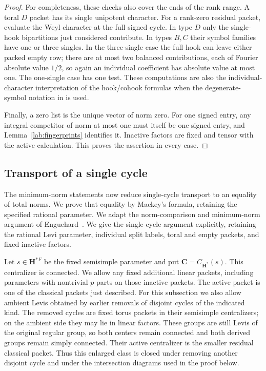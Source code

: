\begin{proof}
For completeness, these checks also cover the ends of the rank
range.  A toral $D$ packet has its single unipotent character.
For a rank-zero residual packet, evaluate the Weyl character at
the full signed cycle.  In type $D$ only the single-hook
bipartitions just considered contribute.  In types $B,C$ their
symbol families have one or three singles.  In the three-single
case the full hook can leave either packed empty row; there are
at most two balanced contributions, each of Fourier absolute
value $1/2$, so again an individual coefficient has absolute
value at most one.  The one-single case has one test.  These
computations are also the individual-character interpretation
of the hook/cohook formulas when the degenerate-symbol notation
in \cite[Theorem~3.2]{LubeckMalle} is used.

Finally, a zero list is the unique vector of norm zero.  For one
signed entry, any integral competitor of norm at most one must
itself be one signed entry, and Lemma~\ref{lab:fingerprints}
identifies it.  Inactive factors are fixed and tensor with the
active calculation.  This proves the assertion in every case.
\end{proof}

\subsection{Transport of a single cycle}

The minimum-norm statements now reduce single-cycle transport to
an equality of total norms.  We prove that equality by Mackey's
formula, retaining the specified rational parameter.
We adapt the norm-comparison and minimum-norm argument of
Enguehard~\cite[Section~5.3, equations~(5.3.3)--(5.3.8) and
Lemma~5.3.9]{EnguehardJordan}.  We give the single-cycle argument
explicitly, retaining the rational Levi parameter, individual split
labels, toral and empty packets, and fixed inactive factors.

Let $s\in\mathbf H^{*F}$ be the fixed semisimple parameter and
put $\mathbf C=C_{\mathbf H^*}(s)$.  This centralizer is connected.
We allow any fixed additional linear packets, including parameters
with nontrivial $p$-parts on those inactive packets.  The active
packet is one of the classical packets just described.
For this subsection we also allow ambient Levis obtained by earlier
removals of disjoint cycles of the indicated kind.  The removed
cycles are fixed torus packets in their semisimple centralizers;
on the ambient side they may lie in linear factors.  These groups
are still Levis of the original regular group, so both centers
remain connected and both derived groups remain simply connected.
Their active centralizer is the smaller residual classical packet.
Thus this enlarged class is closed under removing another disjoint
cycle and under the intersection diagrams used in the proof below.

